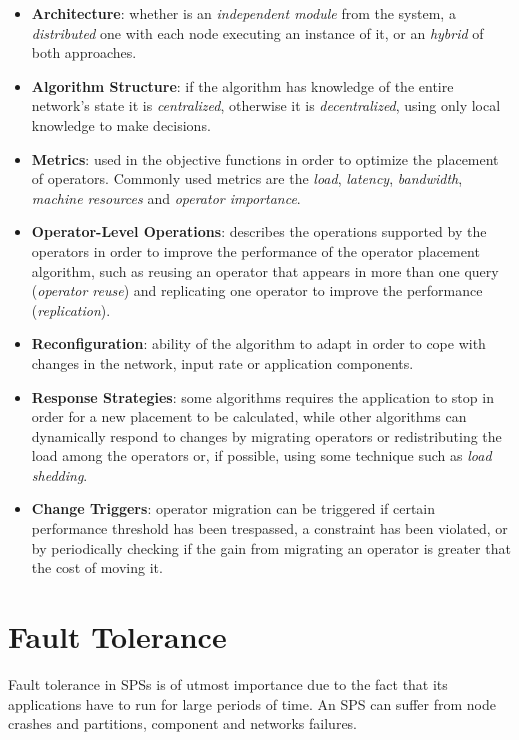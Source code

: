 \documentclass[ppgc,diss,english]{iiufrgs}
\begin{document}
\begin{itemize}
    \item \textbf{Architecture}: whether is an \emph{independent module} from the system, a \emph{distributed} one with each node executing an instance of it, or an \emph{hybrid} of both approaches.
    \item \textbf{Algorithm Structure}: if the algorithm has knowledge of the entire network's state it is \emph{centralized}, otherwise it is \emph{decentralized}, using only local knowledge to make decisions.
    \item \textbf{Metrics}: used in the objective functions in order to optimize the placement of operators. Commonly used metrics are the \emph{load}, \emph{latency}, \emph{bandwidth}, \emph{machine resources} and \emph{operator importance}.
    \item \textbf{Operator-Level Operations}: describes the operations supported by the operators in order to improve the performance of the operator placement algorithm, such as reusing an operator that appears in more than one query (\emph{operator reuse}) and replicating one operator to improve the performance (\emph{replication}).
    \item \textbf{Reconfiguration}: ability of the algorithm to adapt in order to cope with changes in the network, input rate or application components.
    \item \textbf{Response Strategies}: some algorithms requires the application to stop in order for a new placement to be calculated, while other algorithms can dynamically respond to changes by migrating operators or redistributing the load among the operators or, if possible, using some technique such as \emph{load shedding}.
    \item \textbf{Change Triggers}: operator migration can be triggered if certain performance threshold has been trespassed, a constraint has been violated, or by periodically checking if the gain from migrating an operator is greater that the cost of moving it.
\end{itemize}

\section{Fault Tolerance}
\label{sec:esp:fault_tolerance}

Fault tolerance in SPSs is of utmost importance due to the fact that its applications have to run for large periods of time. An SPS can suffer from node crashes and partitions, component and networks failures.
\end{document}
